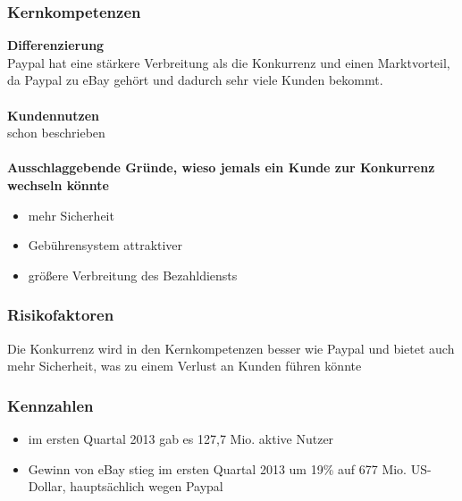 \subsubsection{Kernkompetenzen}
\textbf{Differenzierung}\\
Paypal hat eine stärkere Verbreitung als die Konkurrenz und einen Marktvorteil, da Paypal zu eBay gehört und dadurch sehr viele Kunden bekommt.\\
\\
\textbf{Kundennutzen}\\
schon beschrieben\\
\\
\textbf{Ausschlaggebende Gründe, wieso jemals ein Kunde zur Konkurrenz wechseln könnte}
\begin{itemize}
\item mehr Sicherheit
\item Gebührensystem attraktiver
\item größere Verbreitung des Bezahldiensts
\end{itemize}

\subsubsection{Risikofaktoren}
Die Konkurrenz wird in den Kernkompetenzen besser wie Paypal und bietet auch mehr Sicherheit, was zu einem Verlust an Kunden führen könnte

\subsubsection{Kennzahlen}
\begin{itemize}
\item im ersten Quartal 2013 gab es 127,7 Mio. aktive Nutzer
\item Gewinn von eBay stieg im ersten Quartal 2013 um 19\% auf 677 Mio. US-Dollar, hauptsächlich wegen Paypal
\end{itemize}
